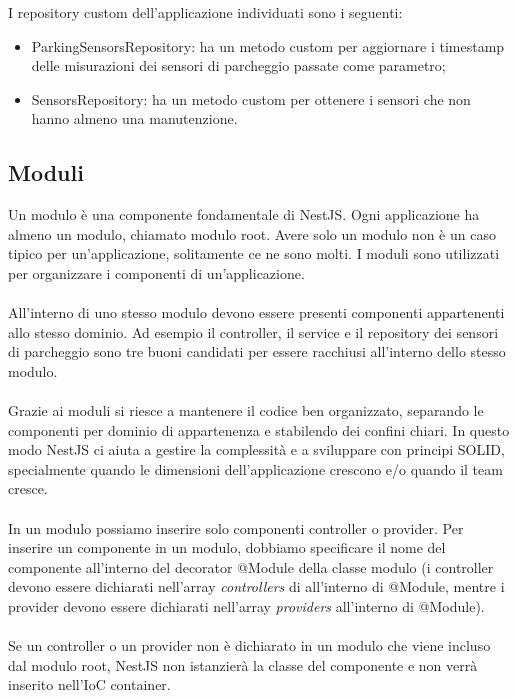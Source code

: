 \leavevmode\newline
I repository custom dell'applicazione individuati sono i seguenti:
\begin{itemize}
    \item ParkingSensorsRepository: ha un metodo custom per aggiornare i timestamp delle misurazioni dei sensori di parcheggio 
        passate come parametro;
    \item SensorsRepository: ha un metodo custom per ottenere i sensori che non hanno almeno una manutenzione.
\end{itemize}

\subsection{Moduli}
Un modulo è una componente fondamentale di NestJS. Ogni applicazione ha almeno un modulo, chiamato modulo root. 
Avere solo un modulo non è un caso tipico per un'applicazione, solitamente ce ne sono molti.
I moduli sono utilizzati per organizzare i componenti di un'applicazione.
\\\\
All'interno di uno stesso modulo devono essere presenti componenti appartenenti allo stesso dominio. Ad esempio
il controller, il service e il repository dei sensori di parcheggio sono tre buoni candidati per essere racchiusi 
all'interno dello stesso modulo.
\\\\
Grazie ai moduli si riesce a mantenere il codice ben organizzato, separando le componenti per dominio di appartenenza
e stabilendo dei confini chiari. In questo modo NestJS ci aiuta a gestire la complessità e a 
sviluppare con principi SOLID, specialmente quando le dimensioni dell'applicazione crescono e/o quando il team cresce.
\\\\
In un modulo possiamo inserire solo componenti controller o provider. Per inserire un componente in un modulo, dobbiamo
specificare il nome del componente all'interno del decorator
@Module della classe modulo (i controller devono essere dichiarati nell'array \textit{controllers} di all'interno di @Module,
mentre i provider devono essere dichiarati nell'array \textit{providers} all'interno di @Module). 
\\\\
Se un controller o un provider non è dichiarato in un modulo che viene incluso dal modulo
root, NestJS non istanzierà la classe del componente e non verrà inserito nell'IoC container.
